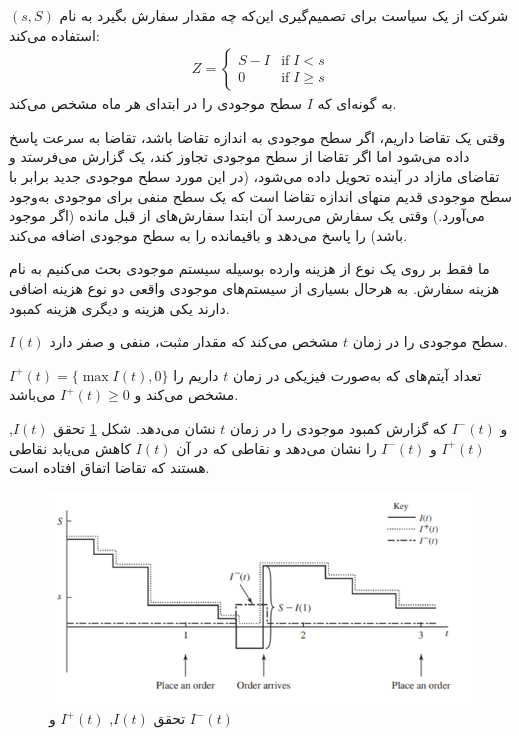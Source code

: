 \documentclass[12pt,a4paper]{report}
\begin{document}
شرکت  از یک سیاست برای تصمیم‌گیری این‌که چه مقدار سفارش بگیرد به نام $(s,S)$  استفاده می‌کند:
\begin{align*}
	Z=\begin{cases}
		S-I& \mathrm{if}\; I<s\\
		0&\mathrm{if}\; I\geq s
	\end{cases}
\end{align*}
به گونه‌ای که $I$ سطح موجودی را در ابتدای هر ماه مشخص می‌کند.

وقتی یک تقاضا داریم، اگر سطح موجودی به اندازه تقاضا باشد، تقاضا به سرعت پاسخ داده می‌شود اما اگر تقاضا از سطح موجودی تجاوز کند، یک گزارش  می‌فرستد و تقاضای مازاد در آینده تحویل داده می‌شود، (در این مورد سطح موجودی جدید برابر با سطح موجودی قدیم منهای اندازه تقاضا است که یک سطح منفی برای موجودی به‌وجود می‌آورد.) وقتی یک سفارش می‌رسد آن ابتدا سفارش‌های از قبل مانده (اگر موجود باشد) را پاسخ می‌دهد و باقیمانده را به سطح موجودی اضافه می‌کند.

ما فقط بر روی یک نوع از هزینه وارده بوسیله سیستم موجودی بحث می‌کنیم به نام هزینه سفارش. به هرحال بسیاری از سیستم‌های موجودی واقعی دو نوع هزینه اضافی دارند یکی هزینه   و دیگری هزینه کمبود.

$I(t)$
سطح موجودی را در زمان $t$ مشخص می‌کند که مقدار مثبت، منفی و صفر دارد.

$I^+(t)=\{\max I(t),0\}$
تعداد آیتم‌های که به‌صورت فیزیکی در زمان $t$ داریم را مشخص می‌کند و $I^+(t)\geq0$ می‌باشد.

و
$ I^-(t)$
که گزارش کمبود موجودی را در زمان $t$ نشان می‌دهد. 
شکل \ref{fig1}
تحقق 
$I(t)$, $I^+(t)$ و $I^-(t)$
را نشان می‌دهد و نقاطی که در آن $I(t)$ کاهش می‌یابد نقاطی هستند که تقاضا اتفاق افتاده است.
\\

\begin{figure}[h!]
	\centering
	\includegraphics[width=.8\textwidth]{Figures/fig1}
	\caption{تحقق    $I(t)$, $I^+(t)$ و $I^-(t)$}\label{fig1}
\end{figure} 
\end{document}
